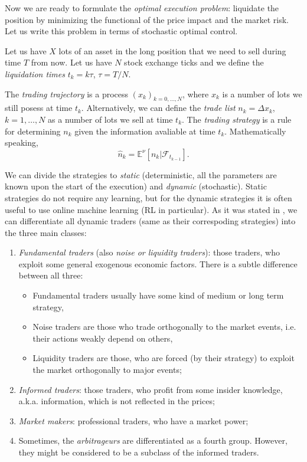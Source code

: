     Now we are ready to formulate the \emph{optimal execution problem}: liquidate the position by minimizing the functional of the price impact and the market risk. 
    Let us write this problem in terms of stochastic optimal control.

    Let us have $X$ lots of an asset in the long position that we need to sell during time $T$ from now.
    Let us have $N$ stock exchange ticks and we define the \emph{liquidation times} $t_k = k\tau$, $\tau = T/N$.
    \begin{definition}
        The \emph{trading trajectory} is a process $(x_k)_{k = 0, \dots, N}$, where $x_k$ is a number of lots we 
        still posess at time $t_k$. Alternatively, we can define the \emph{trade list} $n_k = \Delta x_k$, $k = 1, \dots, N$ as a 
        number of lots we sell at time $t_k$.
        The \emph{trading strategy} is a rule for determining $n_k$ given the information avaliable at time $t_k$. Mathematically speaking,
        \begin{equation*}
            \hat n_k = \mathbb{E}^\nu\left[n_k\vert \mathcal{F}_{t_{k-1}}\right]. 
        \end{equation*} 
    \end{definition}
    We can divide the strategies to \emph{static} (deterministic, all the parameters are known upon the start of the execution) and \emph{dynamic} (stochastic).
    Static strategies do not require any learning, but for the dynamic strategies it is often useful to use online machine learning (RL in particular).
    As it was stated in \cite{Cartea2015}, we can differentiate all dynamic traders (same as their correspoding strategies) into the three main classes:
    \begin{enumerate}
        \item \emph{Fundamental traders} (also \emph{noise \emph{or} liquidity traders}): those traders, who exploit some general exogenous economic factors. There is a subtle difference between all three: \begin{itemize}
            \item Fundamental traders usually have some kind of medium or long term strategy,
            \item Noise traders are those who trade orthogonally to the market events, i.e. their actions weakly depend on others,
            \item Liquidity traders are those, who are forced (by their strategy) to exploit the market orthogonally to major events;
        \end{itemize}
        \item \emph{Informed traders}: those traders, who profit from some insider knowledge, a.k.a. information, which is not reflected in the prices;
        \item \emph{Market makers}: professional traders, who have a market power;
        \item Sometimes, the \emph{arbitrageurs} are differentiated as a fourth group. However, they might be considered to be a subclass of the informed traders.
    \end{enumerate}

